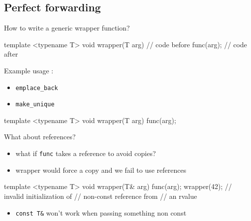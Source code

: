 \subsection[forward]{Perfect forwarding}

\begin{frame}[fragile]
  How to write a generic wrapper function?
  \begin{block}{}
    \begin{cppcode*}{}
      template <typename T>
      void wrapper(T arg) {
        // code before
        func(arg);
        // code after
      }
    \end{cppcode*}
  \end{block}
  Example usage :
  \begin{itemize}
  \item \texttt{emplace_back}
  \item \texttt{make_unique}
  \end{itemize}
\end{frame}

\begin{frame}[fragile]
  \begin{block}{}
    \begin{cppcode*}{}
      template <typename T>
      void wrapper(T arg) {
        func(arg);
      }
    \end{cppcode*}
  \end{block}
  \begin{alertblock}{What about references?}
    \begin{itemize}
      \item what if \texttt{func} takes a reference to avoid copies?
      \item wrapper would force a copy and we fail to use references
    \end{itemize}

  \end{alertblock}
\end{frame}

\begin{frame}[fragile]
  \begin{block}{}
    \begin{cppcode*}{}
      template <typename T>
      void wrapper(T& arg) {
        func(arg);
      }
      wrapper(42);
      // invalid initialization of
      // non-const reference from
      // an rvalue
    \end{cppcode*}
  \end{block}
  \begin{alertblock}{}
    \begin{itemize}
      \item \texttt{const T&} won't work when passing something non const
    \end{itemize}
  \end{alertblock}
\end{frame}

